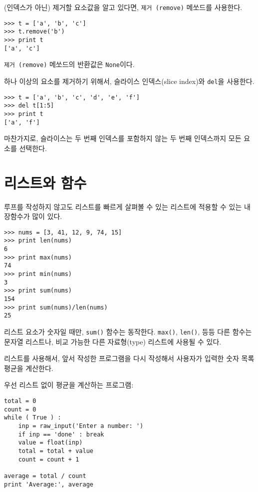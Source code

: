 (인덱스가 아닌) 제거할 요소값을 알고 있다면, {\tt 제거 (remove)} 메쏘드를 사용한다.


\beforeverb
\begin{verbatim}
>>> t = ['a', 'b', 'c']
>>> t.remove('b')
>>> print t
['a', 'c']
\end{verbatim}
\afterverb
%

{\tt 제거 (remove)} 메쏘드의 반환값은 {\tt None}이다.


하나 이상의 요소를 제거하기 위해서, 슬라이스 인덱스(slice index)와 {\tt del}을 사용한다.

\beforeverb
\begin{verbatim}
>>> t = ['a', 'b', 'c', 'd', 'e', 'f']
>>> del t[1:5]
>>> print t
['a', 'f']
\end{verbatim}
\afterverb
%

마찬가지로, 슬라이스는 두 번째 인덱스를 포함하지 않는 두 번째 인덱스까지 모든 요소를 선택한다.

\section{리스트와 함수}

루프를 작성하지 않고도 리스트를 빠르게 살펴볼 수 있는 리스트에 적용할 수 있는 내장함수가 많이 있다.

\beforeverb
\begin{verbatim}
>>> nums = [3, 41, 12, 9, 74, 15]
>>> print len(nums)
6
>>> print max(nums)
74
>>> print min(nums)
3
>>> print sum(nums)
154
>>> print sum(nums)/len(nums)
25
\end{verbatim}
\afterverb
%

리스트 요소가 숫자일 때만, {\tt sum()} 함수는 동작한다. 
{\tt max()}, {\tt len()}, 등등 다른 함수는 문자열 리스트나, 비교 가능한 다른 자료형(type) 리스트에 사용될 수 있다.

리스트를 사용해서, 앞서 작성한 프로그램을 다시 작성해서 사용자가 입력한 숫자 목록 평균을 계산한다. 

우선 리스트 없이 평균을 계산하는 프로그램:

\beforeverb
\begin{verbatim}
total = 0
count = 0
while ( True ) :
    inp = raw_input('Enter a number: ')
    if inp == 'done' : break
    value = float(inp)
    total = total + value
    count = count + 1

average = total / count
print 'Average:', average
\end{verbatim}
\afterverb
%

